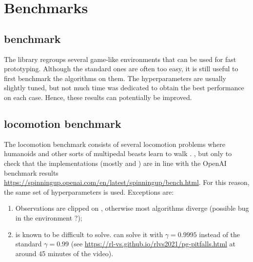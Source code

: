 \chapter{Benchmarks}

\section{\gym benchmark}

The \gym library regroups several game-like environments that can be used for fast prototyping. Although the standard ones are often too easy, it is still useful to first benchmark the algorithms on them. The hyperparameters are usually slightly tuned, but not much time was dedicated to obtain the best performance on each case. Hence, these results can potentially be improved.



\section{\mujoco locomotion benchmark}

The \mujoco locomotion benchmark consists of several locomotion problems where humanoids and other sorts of multipedal beasts learn to walk \cite{mujoco}. , but only to check that the implementations (mostly \tdt and \sac) are in line with the OpenAI benchmark results \url{https://spinningup.openai.com/en/latest/spinningup/bench.html}. For this reason, the same set of hyperparameters is used. Exceptions are:

\begin{enumerate}
	\item Observations are clipped on , otherwise most algorithms diverge (possible bug in the environment ?);
	\item {} is known to be difficult to solve. \ppo can solve it with $\gamma = 0.9995$ instead of the standard $\gamma = 0.99$ (see \url{https://rl-vs.github.io/rlvs2021/pg-pitfalls.html} at around 45 minutes of the video).
\end{enumerate}

